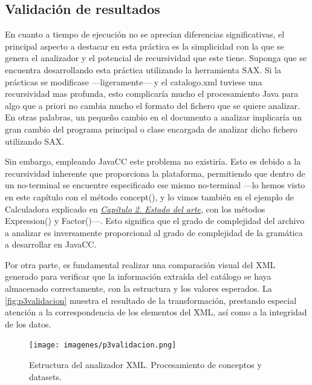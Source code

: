 \subsection{Validación de resultados}

En cuanto a tiempo de ejecución no se aprecian diferencias significativas, el principal aspecto a destacar en esta práctica es la simplicidad con la que se genera el analizador y el potencial de recursividad que este tiene. 
Suponga que se encuentra desarrollando esta práctica utilizando la herramienta SAX. Si la prácticas se modificase ---ligeramente--- y el catalogo.xml tuviese una recursividad mas profunda, esto complicaría mucho el procesamiento Java para algo que a priori no cambia mucho el formato del fichero que se quiere analizar. En otras palabras, un pequeño cambio en el documento a analizar implicaría un gran cambio del programa principal o clase encargada de analizar dicho fichero utilizando SAX.

Sin embargo, empleando JavaCC este problema no existiría. Esto es debido a la recursividad inherente que proporciona la plataforma, permitiendo que dentro de un no-terminal se encuentre especificado ese mismo no-terminal ---lo hemos visto en este capítulo con el método concept(), y lo vimos también en el ejemplo de Calculadora explicado en \hyperref[sec:cap2]{\textit{Capítulo 2. Estado del arte}}, con los métodos Expression() y Factor()---. Esto significa que el grado de complejidad del archivo a analizar es inversamente proporcional al grado de complejidad de la gramática a desarrollar en JavaCC.

Por otra parte, es fundamental realizar una comparación visual del XML generado para verificar que la información extraída del catálogo se haya almacenado correctamente, con la estructura y los valores esperados. La \autoref{fig:p3validacion} muestra el resultado de la transformación, prestando especial atención a la correspondencia de los elementos del XML, así como a la integridad de los datos.

\begin{figure}[H]
	\centering
	\texttt{[image: imagenes/p3validacion.png]}
	\caption{\label{fig:p3validacion}Estructura del analizador XML. Procesamiento de conceptos y datasets.}
\end{figure}


